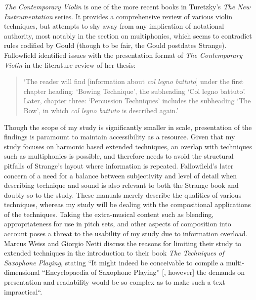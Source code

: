 \emph{The Contemporary Violin} is one of the more recent books in Turetzky’s \emph{The New Instrumentation} series.\autocite[]{strangeContemporaryViolinExtended2001} 
It provides a comprehensive review of various violin techniques, but attempts to shy away from any implication of notational authority, most notably in the section on multiphonics, which seems to contradict rules codified by Gould (though to be fair, the Gould postdates Strange).\autocites[134]{strangeContemporaryViolinExtended2001}[257--258]{gouldBars2011} 
Fallowfield identified issues with the presentation format of \emph{The Contemporary Violin} in the literature review of her thesis: 
\begin{quotation}
 ‘The reader will find [information about \textit{col legno battuto}] under the first chapter heading: ‘Bowing Technique’, the subheading ‘Col legno battuto’. Later, chapter three: ‘Percussion Techniques’ includes the subheading ‘The Bow’, in which \textit{col legno battuto} is described again.’\autocite[12]{fallowfieldCelloMapHandbook2009}
\end{quotation}
Though the scope of my study is significantly smaller in scale, presentation of the findings is paramount to maintain accessibility as a resource. 
Given that my study focuses on harmonic based extended techniques, an overlap with techniques such as multiphonics is possible, and therefore needs to avoid the structural pitfalls of Strange’s layout where information is repeated. 
Fallowfield’s later concern of a need for a balance between subjectivity and level of detail when describing technique and sound is also relevant to both the Strange book and doubly so to the study. 
These manuals merely describe the qualities of various techniques, whereas my study will be dealing with the compositional applications of the techniques. 
Taking the extra-musical content such as blending, appropriateness for use in pitch sets, and other aspects of composition into account poses a threat to the usability of my study due to information overload. 
Marcus Weiss and Giorgio Netti discuss the reasons for limiting their study to extended techniques in the introduction to their book \emph{The Techniques of Saxophone Playing}, stating ``It might indeed be conceivable to compile a multi-dimensional “Encyclopaedia of Saxophone Playing” [, however] the demands on presentation and readability would be so complex as to make such a text impractical``.\autocite[Introduction]{weissTechniquesSaxophonePlaying2010}

